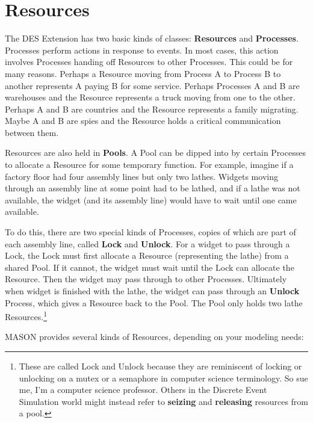 \documentclass[twoside,10pt]{article}
\begin{document}
\section{Resources}

The DES Extension has two basic kinds of classes:  {\bf Resources} and {\bf Processes}.   Processes perform actions in response to events.  In most cases, this action involves Processes handing off Resources to other Processes.  This could be for many reasons.  Perhaps a Resource moving from Process A to Process B to another represents A paying B for some service.  Perhaps Processes A and B are warehouses and the Resource represents a truck moving from one to the other.  Perhaps A and B are countries and the Resource represents a family migrating.  Maybe A and B are spies and the Resource holds a critical communication between them.

Resources are also held in {\bf Pools}.  A Pool can be dipped into by certain Processes to allocate a Resource for some temporary function.  For example, imagine if a factory floor had four assembly lines but only two lathes.  Widgets moving through an assembly line at some point had to be lathed, and if a lathe was not available, the widget (and its assembly line) would have to wait until one came available.

To do this, there are two special kinds of Processes, copies of which are part of each assembly line, called {\bf Lock} and {\bf Unlock}.  For a widget to pass through a Lock, the Lock must first allocate a Resource (representing the lathe) from a shared Pool.  If it cannot, the widget must wait until the Lock can allocate the Resource.  Then the widget may pass through to other Processes.  Ultimately when widget is finished with the lathe, the widget can pass through an {\bf Unlock} Process, which gives a Resource back to the Pool.   The Pool only holds two lathe Resources.\footnote{These are called Lock and Unlock because they are reminiscent of locking or unlocking on a mutex or a semaphore in computer science terminology.   So sue me, I'm a computer science professor. Others in the Discrete Event Simulation world might instead refer to {\bf seizing} and {\bf releasing} resources from a pool.}
  
MASON provides several kinds of Resources, depending on your modeling needs:
\end{document}
